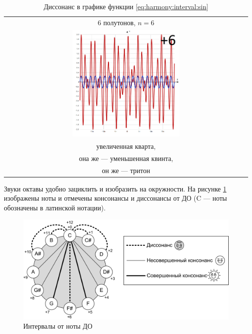 \begin{table}[!ht]
    \caption{Диссонанс в графике функции \eqref{eq:harmony:interval:sin}}
    \label{t:harmony:interval:disso-6}
    \centering
    \begin{tabular}{c}
        \hline\hline
        6 полутонов, $n=6$ \\
        \includegraphics[width=0.45\textwidth]{fig/intervals/i06} \\
        увеличенная кварта,\\
        она же --- уменьшенная квинта,\\
        он же --- тритон\\
        \hline\hline
    \end{tabular}
\end{table}

Звуки октавы удобно зациклить и изобразить на окружности. На рисунке \ref{fig:harmony:interval:oct-round} изображены ноты и отмечены консонансы и диссонансы от ДО (C --- ноты обозначены в латинской нотации). 

\begin{figure}[!ht]
    \centering
    \includegraphics[width=\textwidth]{fig/intervals/octave-round} 
    \caption{Интервалы от ноты ДО}\label{fig:harmony:interval:oct-round}
\end{figure} 

